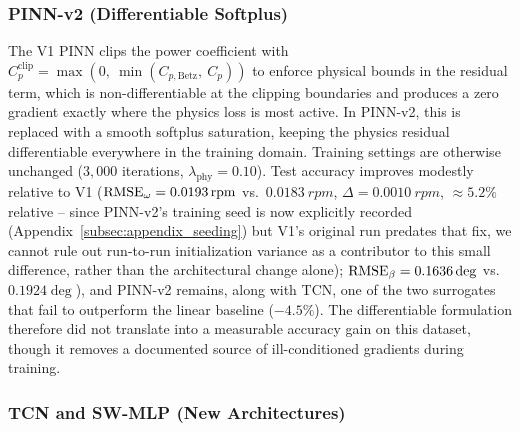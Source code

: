 \subsubsection{PINN-v2 (Differentiable Softplus)}
\label{subsubsec:pinn_v2}

The V1 PINN clips the power coefficient with
$C_{p}^{\text{clip}} = \max(0,\ \min(C_{p,\text{Betz}},\ C_{p}))$ to enforce
physical bounds in the residual term, which is non-differentiable at the
clipping boundaries and produces a zero gradient exactly where the physics
loss is most active. In PINN-v2, this is replaced with a smooth softplus
saturation, keeping the physics residual differentiable everywhere in the
training domain. Training settings are otherwise unchanged ($3{,}000$
iterations, $\lambda_{\text{phy}}=0.10$). Test accuracy improves modestly relative to V1
($\text{RMSE}_{\omega}=\SI{0.0193}{rpm}$ vs.\ $\SI{0.0183}{rpm}$,
$\Delta=\SI{0.0010}{rpm}$, $\approx5.2\%$ relative -- since PINN-v2's
training seed is now explicitly recorded (Appendix~\ref{subsec:appendix_seeding})
but V1's original run predates that fix, we cannot rule out
run-to-run initialization variance as a contributor to this small
difference, rather than the architectural change alone);
$\text{RMSE}_{\beta}=0.1636\deg$ vs.\ $0.1924\deg$), and PINN-v2 remains, along
with TCN, one of the two surrogates that fail to outperform the linear
baseline ($-4.5\%$). The differentiable formulation therefore did not
translate into a measurable accuracy gain on this dataset, though it
removes a documented source of ill-conditioned gradients during training.

\subsubsection{TCN and SW-MLP (New Architectures)}
\label{subsubsec:tcn_swmlp}


